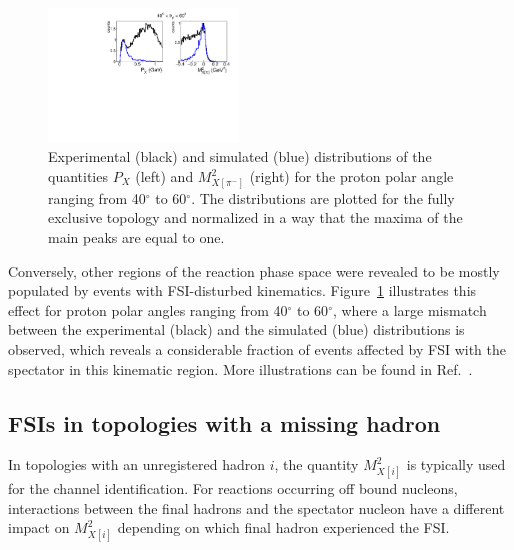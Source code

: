 \documentclass[prc,twocolumn,superscriptaddress,showpacs,amssymb,amsmath,amsfonts,aps,nofootinbib]{revtex4-1}
\begin{document}
\begin{figure}[htp]
\begin{center}
\includegraphics[width=0.45\textwidth]{pictures/fsi/fsi2.pdf}
\caption{\small Experimental (black) and simulated (blue) distributions of the quantities $P_{X}$ (left) and $M^{2}_{X[\pi^{-}]}$ (right) for the proton polar angle ranging from 40$^{\circ}$ to 60$^{\circ}$. The distributions are plotted for the fully exclusive topology and normalized in a way that the maxima of the main peaks are equal to one.} \label{fig:fsi_pr_ang}
\end{center}
\end{figure}


Conversely, other regions of the reaction phase space were revealed to be mostly populated by events with FSI-disturbed kinematics. Figure~\ref{fig:fsi_pr_ang} illustrates this effect for proton polar angles ranging from 40$^{\circ}$ to 60$^{\circ}$, where a large mismatch between the experimental (black) and the simulated (blue) distributions is observed, which reveals a considerable fraction of events affected by FSI with the spectator in this kinematic region. More illustrations can be found in Ref.\!~\cite{my_thesis:2021}.





\subsection{FSIs in topologies with a missing hadron}
\label{sect:fsi_top_miss}

In topologies with an unregistered hadron $i$, the quantity $M^{2}_{X[i]}$ is typically used for the channel identification. For reactions occurring off bound nucleons, interactions between the final hadrons and the spectator nucleon have a different impact on $M^{2}_{X[i]}$ depending on which final hadron experienced the FSI.
\end{document}
